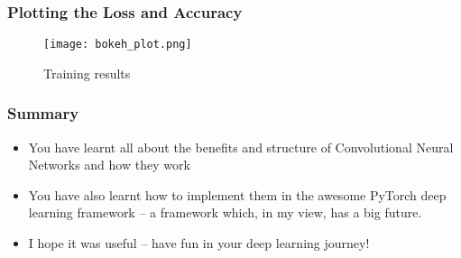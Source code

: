\documentclass[14 pt]{beamer}
\let\olditem\item
\renewcommand{\item}{\olditem\vspace{4pt}}
\begin{document}
\begin{frame}
  \frametitle{Plotting the Loss and Accuracy}
  \begin{figure}
    \centering
    \texttt{[image: bokeh\_plot.png]}
    \caption{Training results}
  \end{figure}
\end{frame}
\begin{frame}
  \frametitle{Summary}
  \begin{itemize}
  \item  You have learnt all about the benefits and
    structure of Convolutional Neural Networks and how they work
  \item  You have
    also learnt how to implement them in the awesome PyTorch deep learning
    framework – a framework which, in my view, has a big future. 
  \item I hope it
    was useful – have fun in your deep learning journey!
  \end{itemize}
\end{frame}
\end{document}
